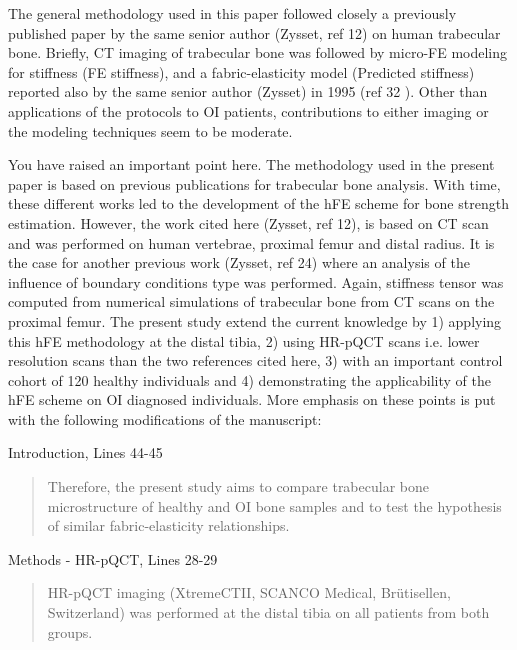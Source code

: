 \documentclass{AR2RC}
\begin{document}
\RC The general methodology used in this paper followed closely a previously published paper by the same senior author (Zysset, ref 12) on human trabecular bone. Briefly, CT imaging of trabecular bone was followed by micro-FE modeling for stiffness (FE stiffness), and a fabric-elasticity model (Predicted stiffness) reported also by the same senior author (Zysset) in 1995 (ref 32 ). Other than applications of the protocols to OI patients, contributions to either imaging or the modeling techniques seem to be moderate.

\AR You have raised an important point here. The methodology used in the present paper is based on previous publications for trabecular bone analysis. With time, these different works led to the development of the hFE scheme for bone strength estimation. However, the work cited here (Zysset, ref 12), is based on \si{\micro}CT scan and was performed on human vertebrae, proximal femur and distal radius. It is the case for another previous work (Zysset, ref 24) where an analysis of the influence of boundary conditions type was performed. Again, stiffness tensor was computed from numerical simulations of trabecular bone from \si{\micro}CT scans on the proximal femur. The present study extend the current knowledge by 1) applying this hFE methodology at the distal tibia, 2) using HR-pQCT scans i.e. lower resolution scans than the two references cited here, 3) with an important control cohort of 120 healthy individuals and 4) demonstrating the applicability of the hFE scheme on OI diagnosed individuals. More emphasis on these points is put with the following modifications of the manuscript:\par

Introduction, Lines 44-45
\begin{quote}
	Therefore, the present study aims to compare trabecular bone microstructure of healthy and OI bone samples and to test the hypothesis of similar fabric-elasticity relationships.
\end{quote}

Methods - HR-pQCT, Lines 28-29
\begin{quote}
	HR-pQCT imaging (XtremeCTII, SCANCO Medical, Brütisellen, Switzerland) was performed at the distal tibia on all patients from both groups. 
\end{quote}
\end{document}
